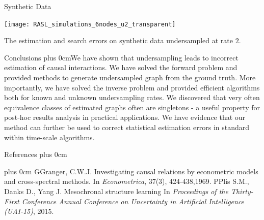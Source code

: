 \documentclass[final,hyperref={pdfpagelabels=false}]{beamer}
\renewcommand{\raggedright}{\leftskip=0.5cm \rightskip=0.5cm plus 0cm}
\begin{document}
\begin{frame}{}
\begin{columns}[t]
\begin{column}{.48\linewidth}
\begin{block}{\Large Synthetic Data}
        \begin{minipage}{1\textwidth}
                \vspace{5 mm}
          \texttt{[image: RASL\_simulations\_6nodes\_u2\_transparent]}

        \end{minipage} %

        \begin{minipage}{.95\textwidth}
        \vspace{5 mm}
           The estimation and search errors on synthetic data undersampled at rate $2$. 
        \end{minipage}%
        \end{block}

        \begin{block}{\Large Conclusions}
          \raggedright We have shown that undersampling leads to incorrect estimation of causal interactions. We have solved the forward problem and provided methods to generate undersampled graph from the ground truth. More importantly, we have solved the inverse problem and provided efficient algorithms both for known and unknown undersampling rates.  We discovered that very often equivalence classes of estimated graphs often are singletons - a useful property for post-hoc results analysis in practical applications. We have evidence that our method can further be used to correct  statistical estimation errors in standard within time-scale algorithms.
        \end{block}
        \begin{block}{References}
          \raggedright
          \footnotesize
          \begin{thebibliography}{2}
            \raggedright
          \bibitem
             GGranger, C.W.J.
            \newblock Investigating causal relations by econometric models and cross-spectral methods.
            \newblock In \emph{Econometrica}, 37(3), 424-438,1969.
          \bibitem
             PPlis S.M., Danks D., Yang J.
            \newblock Mesochronal structure learning
            \newblock In \emph{Proceedings of the Thirty-First Conference Annual Conference
  on Uncertainty in Artificial Intelligence (UAI-15)}, 2015.
          \end{thebibliography}
        \end{block}
      \end{column}
    \end{columns}
  \end{frame}
\end{document}

